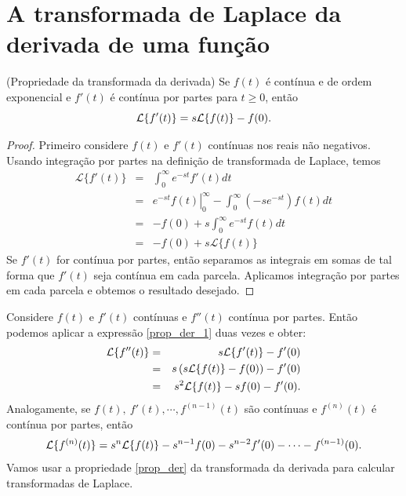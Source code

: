 \section{A transformada de Laplace da derivada de uma função}
\begin{teo}{\label{prop_der}}(Propriedade da transformada da derivada) Se $f(t)$ é contínua e de ordem exponencial e $f'(t)$ é contínua por partes para $t\geq 0$, então
\begin{equation}{\label{prop_der_1}}
\mathcal{L }\{f'(t)\}=s \mathcal{L }\{ f(t)\}-f(0).
\end{equation}
\end{teo}
\begin{proof}
Primeiro considere $f(t)$ e $f'(t)$ contínuas nos reais não negativos. Usando integração por partes na definição de transformada de Laplace, temos 
\begin{eqnarray*}
 \mathcal{L}\{f'(t)\}&=&\int_0^\infty e^{-st} f'(t)dt\\
 &=&\left.e^{-st}f(t)\right|_0^\infty-  \int_0^\infty (-se^{-st}) f(t)dt\\
 &=&-f(0)+  s\int_0^\infty e^{-st}f(t)dt\\
 &=&-f(0)+  s\mathcal{L}\{f(t)\}
 \end{eqnarray*}
Se $f'(t)$ for contínua por partes, então separamos as integrais em somas de tal forma que $f'(t)$ seja contínua em cada parcela. Aplicamos integração por partes em cada parcela e obtemos o resultado desejado.
\end{proof}
Considere $f(t)$ e $f'(t)$ contínuas e $f''(t)$ contínua por partes. Então podemos aplicar a expressão \ref{prop_der_1} duas vezes e obter:
\begin{eqnarray}
\nonumber \mathcal{L }\{f''(t)\}&=&s \mathcal{L }\{ f'(t)\}-f'(0)\\ 
\nonumber &=&s\left( s \mathcal{L }\{ f(t)\}-f(0)\right)-f'(0)\\
&=& s^2 \mathcal{L }\{ f(t)\}-sf(0)-f'(0). {\label{prop_der_2}}
\end{eqnarray}
Analogamente, se $f(t),\ f'(t), \cdots, f^{(n-1)}(t)$ são contínuas e $f^{(n)}(t) $ é contínua por partes, então
\begin{eqnarray}{\label{prop_der_n}}
 \mathcal{L }\{f^{(n)}(t)\}= s^n \mathcal{L }\{ f(t)\}-s^{n-1}f(0)-s^{n-2}f'(0)-\cdots-f^{(n-1)}(0). 
\end{eqnarray}
Vamos usar a propriedade \ref{prop_der} da transformada da derivada para calcular transformadas de Laplace.
